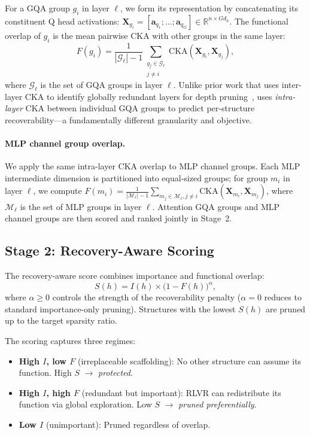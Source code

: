 For a GQA group $g_i$ in layer $\ell$, we form its representation by concatenating its constituent Q head activations: $\mathbf{X}_{g_i} = [\mathbf{a}_{q_1}; \ldots; \mathbf{a}_{q_G}] \in \mathbb{R}^{n \times Gd_h}$.
The functional overlap of $g_i$ is the mean pairwise CKA with other groups in the same layer:
\begin{equation}
    F(g_i) = \frac{1}{|\mathcal{G}_\ell| - 1} \sum_{\substack{g_j \in \mathcal{G}_\ell \\ j \neq i}} \text{CKA}(\mathbf{X}_{g_i}, \mathbf{X}_{g_j}),
    \label{eq:overlap}
\end{equation}
where $\mathcal{G}_\ell$ is the set of GQA groups in layer $\ell$.
Unlike prior work that uses inter-layer CKA to identify globally redundant layers for depth pruning~\citep{mpruner2024,lachance2024cka}, \rasp{} uses \emph{intra-layer} CKA between individual GQA groups to predict per-structure recoverability---a fundamentally different granularity and objective.

\paragraph{MLP channel group overlap.}
We apply the same intra-layer CKA overlap to MLP channel groups.
Each MLP intermediate dimension is partitioned into equal-sized groups; for group $m_i$ in layer $\ell$, we compute $F(m_i) = \frac{1}{|\mathcal{M}_\ell| - 1} \sum_{m_j \in \mathcal{M}_\ell, j \neq i} \text{CKA}(\mathbf{X}_{m_i}, \mathbf{X}_{m_j})$, where $\mathcal{M}_\ell$ is the set of MLP groups in layer $\ell$.
Attention GQA groups and MLP channel groups are then scored and ranked jointly in Stage~2.

\subsection{Stage 2: Recovery-Aware Scoring}
\label{sec:stage2}

The recovery-aware score combines importance and functional overlap:
\begin{equation}
    S(h) = I(h) \times \big(1 - F(h)\big)^\alpha,
    \label{eq:score}
\end{equation}
where $\alpha \ge 0$ controls the strength of the recoverability penalty ($\alpha{=}0$ reduces to standard importance-only pruning).
Structures with the lowest $S(h)$ are pruned up to the target sparsity ratio.

The scoring captures three regimes:
\begin{itemize}[nosep,leftmargin=*]
    \item \textbf{High $I$, low $F$} (irreplaceable scaffolding): No other structure can assume its function. High $S$ $\rightarrow$ \emph{protected}.
    \item \textbf{High $I$, high $F$} (redundant but important): RLVR can redistribute its function via global exploration. Low $S$ $\rightarrow$ \emph{pruned preferentially}.
    \item \textbf{Low $I$} (unimportant): Pruned regardless of overlap.
\end{itemize}

